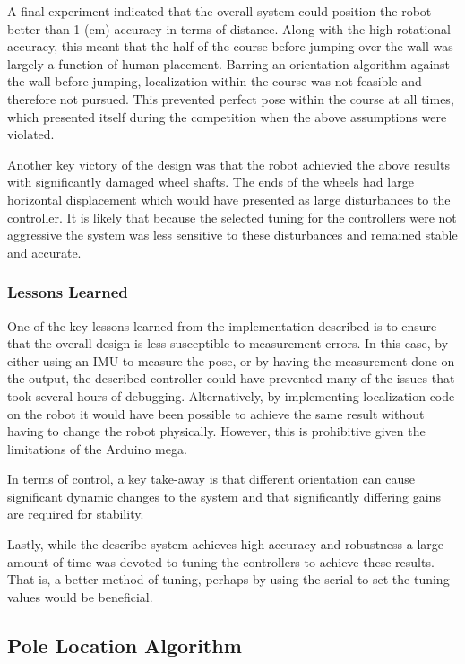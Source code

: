 \documentclass[ece]{uw-wkrpt}
\begin{document}
A final experiment indicated that the overall system could position the robot better than 1 (cm) accuracy in terms of distance. Along with the high rotational accuracy, this meant that the half of the course before jumping over the wall was largely a function of human placement. Barring an orientation algorithm against the wall before jumping, localization within the course was not feasible and therefore not pursued. This prevented perfect pose within the course at all times, which presented itself during the competition when the above assumptions were violated. 

Another key victory of the design was that the robot achievied the above results with significantly damaged wheel shafts. The ends of the wheels had large horizontal displacement which would have presented as large disturbances to the controller. It is likely that because the selected tuning for the controllers were not aggressive the system was less sensitive to these disturbances and remained stable and accurate.

\subsubsection{Lessons Learned}

One of the key lessons learned from the implementation described is to ensure that the overall design is less susceptible to measurement errors. In this case, by either using an IMU to measure the pose, or by having the measurement done on the output, the described controller could have prevented many of the issues that took several hours of debugging. Alternatively, by implementing localization code on the robot it would have been possible to achieve the same result without having to change the robot physically. However, this is prohibitive given the limitations of the Arduino mega. 

In terms of control, a key take-away is that different orientation can cause significant dynamic changes to the system and that significantly differing gains are required for stability. 

Lastly, while the describe system achieves high accuracy and robustness a large amount of time was devoted to tuning the controllers to achieve these results. That is, a better method of tuning, perhaps by using the serial to set the tuning values would be beneficial. 

\subsection{Pole Location Algorithm}
\end{document}
